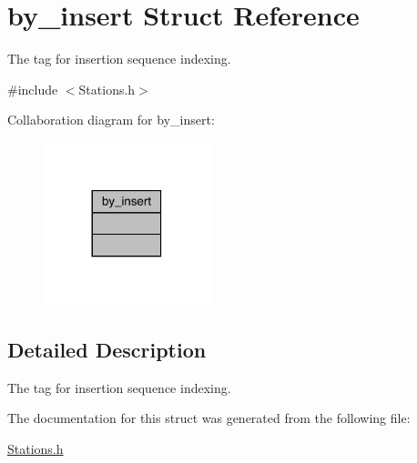 \hypertarget{structby__insert}{}\section{by\+\_\+insert Struct Reference}
\label{structby__insert}


The tag for insertion sequence indexing.  




{\ttfamily \#include $<$Stations.\+h$>$}



Collaboration diagram for by\+\_\+insert\+:\nopagebreak
\begin{figure}[H]
\begin{center}
\leavevmode
\includegraphics[width=137pt]{structby__insert__coll__graph}
\end{center}
\end{figure}


\subsection{Detailed Description}
The tag for insertion sequence indexing. 

The documentation for this struct was generated from the following file\+:\begin{DoxyCompactItemize}
\item 
\mbox{\hyperlink{_stations_8h}{Stations.\+h}}\end{DoxyCompactItemize}
